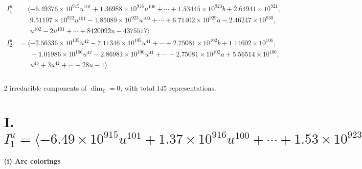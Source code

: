 \documentclass[1p]{elsarticle_modified}
\theoremstyle{definition}
\begin{document}
\begin{align*}
I^u_{1}&=\langle 
-6.49376\times10^{915} u^{101}+1.36988\times10^{916} u^{100}+\cdots+1.53445\times10^{923} b+2.64941\times10^{921},\\
\phantom{I^u_{1}}&\phantom{= \langle  }9.51197\times10^{922} u^{101}-1.85089\times10^{923} u^{100}+\cdots+6.71402\times10^{929} a-2.46247\times10^{930},\\
\phantom{I^u_{1}}&\phantom{= \langle  }u^{102}-2 u^{101}+\cdots+8420092 u-4375517\rangle \\
I^u_{2}&=\langle 
-2.56336\times10^{105} u^{42}-7.11346\times10^{105} u^{41}+\cdots+2.75081\times10^{102} b+1.14602\times10^{106},\\
\phantom{I^u_{2}}&\phantom{= \langle  }-1.01986\times10^{106} u^{42}-2.86981\times10^{106} u^{41}+\cdots+2.75081\times10^{102} a+5.56514\times10^{106},\\
\phantom{I^u_{2}}&\phantom{= \langle  }u^{43}+3 u^{42}+\cdots-28 u-1\rangle \\
\\
\end{align*}
\raggedright * 2 irreducible components of $\dim_{\mathbb{C}}=0$, with total 145 representations.\\
\newpage
\renewcommand{\arraystretch}{1}
\centering \section*{I. $I^u_{1}= \langle -6.49\times10^{915} u^{101}+1.37\times10^{916} u^{100}+\cdots+1.53\times10^{923} b+2.65\times10^{921},\;9.51\times10^{922} u^{101}-1.85\times10^{923} u^{100}+\cdots+6.71\times10^{929} a-2.46\times10^{930},\;u^{102}-2 u^{101}+\cdots+8420092 u-4375517 \rangle$}
\flushleft \textbf{(i) Arc colorings}\\
\end{document}
